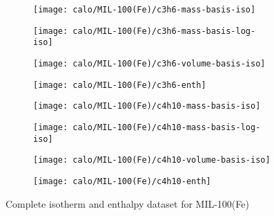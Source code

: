 \begin{figure}[H]
    \begin{subfigure}{0.25\textwidth}
        \texttt{[image: calo/MIL-100(Fe)/c3h6-mass-basis-iso]}%
        \label{appx:fig:shaping:mil100c3h6mass}
    \end{subfigure}%
    \begin{subfigure}{0.25\textwidth}
        \texttt{[image: calo/MIL-100(Fe)/c3h6-mass-basis-log-iso]}%
        \label{appx:fig:shaping:mil100c3h6masslog}
    \end{subfigure}%
    \begin{subfigure}{0.25\textwidth}
        \texttt{[image: calo/MIL-100(Fe)/c3h6-volume-basis-iso]}%
        \label{appx:fig:shaping:mil100c3h6volume}
    \end{subfigure}%
    \begin{subfigure}{0.25\textwidth}
        \texttt{[image: calo/MIL-100(Fe)/c3h6-enth]}%
        \label{appx:fig:shaping:mil100c3h6enth}
    \end{subfigure}%

    \begin{subfigure}{0.25\textwidth}
        \texttt{[image: calo/MIL-100(Fe)/c4h10-mass-basis-iso]}%
        \label{appx:fig:shaping:mil100c4h10mass}
    \end{subfigure}%
    \begin{subfigure}{0.25\textwidth}
        \texttt{[image: calo/MIL-100(Fe)/c4h10-mass-basis-log-iso]}%
        \label{appx:fig:shaping:mil100c4h10masslog}
    \end{subfigure}%
    \begin{subfigure}{0.25\textwidth}
        \texttt{[image: calo/MIL-100(Fe)/c4h10-volume-basis-iso]}%
        \label{appx:fig:shaping:mil100c4h10volume}
    \end{subfigure}%
    \begin{subfigure}{0.25\textwidth}
        \texttt{[image: calo/MIL-100(Fe)/c4h10-enth]}%
        \label{appx:fig:shaping:mil100c4h10enth}
    \end{subfigure}%

    \caption{Complete isotherm and enthalpy dataset for MIL-100(Fe)}%
    \label{appx:fig:shaping:calomil100}
\end{figure}
